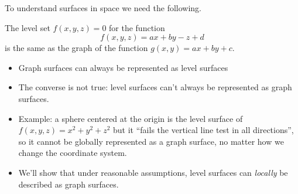 \begin{frame}
To understand surfaces in space we need the following.
\begin{remark} The level set $f(x,y,z)=0$ for the function
%
$$f(x,y,z) = ax+by-z+d$$
%
is the same as the graph of the function $g(x,y) = ax+by+c$.
\end{remark}
\begin{itemize}
\item<2-> Graph surfaces can always be represented as level surfaces
\item<3-> The converse is not true: level surfaces can't always be represented as graph surfaces.
\item<4-> Example: a sphere centered at the origin is the
level surface of $f(x,y,z) = x^2+y^2+z^2$ but it ``fails the vertical line test in all directions'', so it cannot be globally represented as a graph surface, no matter how we change the coordinate system.
\item<5-> We'll show that under reasonable assumptions, level surfaces can \emph{locally} be described as graph surfaces.
\end{itemize}
\end{frame}
